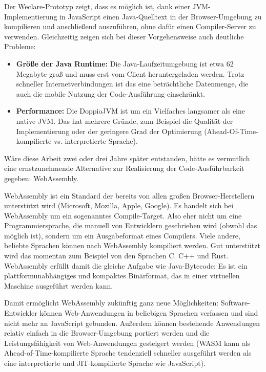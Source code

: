 Der Weclare-Prototyp zeigt, dass es möglich ist, dank einer JVM-Implementierung in JavaScript einen Java-Quelltext in der Browser-Umgebung zu kompilieren und anschließend auszuführen, ohne dafür einen Compiler-Server zu verwenden. Gleichzeitig zeigen sich bei dieser Vorgehensweise auch deutliche Probleme:

\begin{itemize}
    \item \textbf{Größe der Java Runtime:} Die Java-Laufzeitumgebung ist etwa 62 Megabyte groß und muss erst vom Client heruntergeladen werden. Trotz schneller Internetverbindungen ist das eine beträchtliche Datenmenge, die auch die mobile Nutzung der Code-Ausführung einschränkt.
    \item \textbf{Performance:} Die DoppioJVM ist um ein Vielfaches langsamer als eine native JVM. Das hat mehrere Gründe, zum Beispiel die Qualität der Implementierung oder der geringere Grad der Optimierung (Ahead-Of-Time-kompilierte vs. interpretierte Sprache).
\end{itemize}

Wäre diese Arbeit zwei oder drei Jahre später entstanden, hätte es vermutlich eine ernstzunehmende Alternative zur Realisierung der Code-Ausführbarkeit gegeben: WebAssembly.

WebAssembly ist ein Standard der bereits von allen großen Browser-Herstellern unterstützt wird (Microsoft, Mozilla, Apple, Google). Es handelt sich bei WebAssembly um ein sogenanntes Compile-Target. Also eher nicht um eine Programmiersprache, die manuell von Entwicklern geschrieben wird (obwohl das möglich ist), sondern um ein Ausgabeformat eines Compilers. Viele andere, beliebte Sprachen können nach WebAssembly kompiliert werden. Gut unterstützt wird das momentan zum Beispiel von den Sprachen C. C++ und Rust. WebAssembly erfüllt damit die gleiche Aufgabe wie Java-Bytecode: Es ist ein plattformunabhängiges und kompaktes Binärformat, das in einer virtuellen Maschine ausgeführt werden kann.

Damit ermöglicht WebAssembly zukünftig ganz neue Möglichkeiten: Software-Entwickler können Web-Anwendungen in beliebigen Sprachen verfassen und sind nicht mehr an JavaScript gebunden. Außerdem können bestehende Anwendungen relativ einfach in die Browser-Umgebung portiert werden und die Leistungsfähigkeit von Web-Anwendungen gesteigert werden (WASM kann als Ahead-of-Time-kompilierte Sprache tendenziell schneller ausgeführt werden als eine interpretierte und JIT-kompilierte Sprache wie JavaScript).

